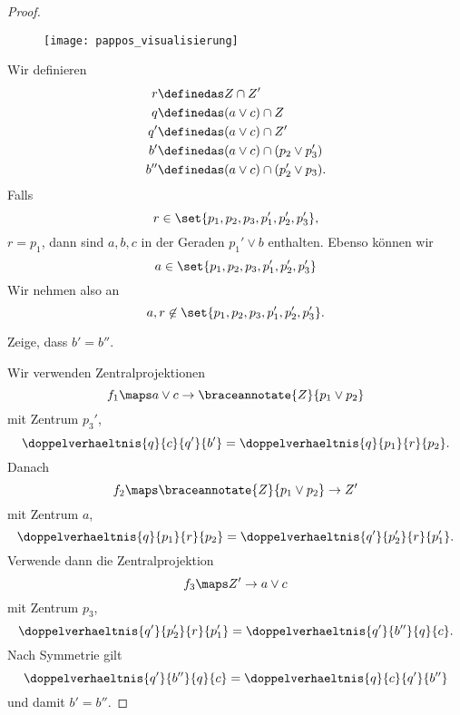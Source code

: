 \begin{proof}
  \begin{figure}
    \centering
    \texttt{[image: pappos\_visualisierung]}
    \label{fig:pappos_visualisierung}
  \end{figure}
  Wir definieren
  \begin{align*}
    r&\definedas Z\cap Z'\\
    q&\definedas (a\vee c)\cap Z\\
    q'&\definedas (a\vee c)\cap Z'\\
    b'&\definedas (a\vee c)\cap (p_2\vee p_3')\\
    b''&\definedas (a\vee c)\cap(p_2'\vee p_3).
  \end{align*}
  Falls 
  \begin{equation*}
    r\in \set{p_1,p_2,p_3,p_1',p_2',p_3'},
  \end{equation*}
  \zb \( r=p_1 \), dann sind \( a,b,c \) in der Geraden \( p_1'\vee b \) enthalten. Ebenso können wir 
  \begin{equation*}
    a\in \set{p_1,p_2,p_3,p_1',p_2',p_3'}
  \end{equation*}
  Wir nehmen also an
  \begin{equation*}
    a,r\not\in \set{p_1,p_2,p_3,p_1',p_2',p_3'}.
  \end{equation*}
  \begin{ziel*}
    Zeige, dass \( b'=b'' \).
  \end{ziel*}
  Wir verwenden Zentralprojektionen
  \begin{equation*}
    f_1\maps a\vee c\to \braceannotate{Z}{p_1\vee p_2}
  \end{equation*}
  mit Zentrum \( p_3' \),
  \begin{equation*}
    \doppelverhaeltnis{q}{c}{q'}{b'}=\doppelverhaeltnis{q}{p_1}{r}{p_2}.
  \end{equation*}
  Danach
  \begin{equation*}
    f_2\maps \braceannotate{Z}{p_1\vee p_2}\to Z'
  \end{equation*}
  mit Zentrum \( a \),
  \begin{equation*}
    \doppelverhaeltnis{q}{p_1}{r}{p_2}=\doppelverhaeltnis{q'}{p_2'}{r}{p_1'}.
  \end{equation*}
  Verwende dann die Zentralprojektion
  \begin{equation*}
    f_3\maps Z'\to a\vee c
  \end{equation*}
  mit Zentrum \( p_3 \),
  \begin{equation*}
    \doppelverhaeltnis{q'}{p_2'}{r}{p_1'}=\doppelverhaeltnis{q'}{b''}{q}{c}.
  \end{equation*}
  Nach Symmetrie gilt
  \begin{equation*}
    \doppelverhaeltnis{q'}{b''}{q}{c}=\doppelverhaeltnis{q}{c}{q'}{b''}
  \end{equation*}
  und damit \( b'=b'' \).
\end{proof}
